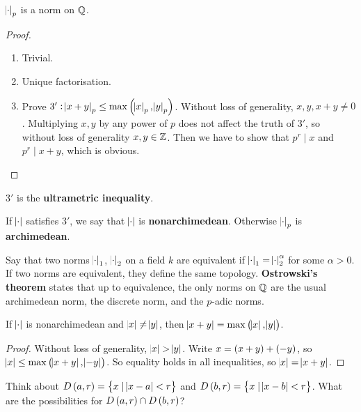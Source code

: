 \begin{lemma}
$ \abs{\cdot}_p $ is a norm on $ \mathbb{Q} $.
\end{lemma}

\begin{proof}
\hfill
\begin{enumerate}
\item Trivial.
\item Unique factorisation.
\item Prove $ 3' : \abs{x + y}_p \le \max\br{\abs{x}_p, \abs{y}_p} $. Without loss of generality, $ x, y, x + y \ne 0 $. Multiplying $ x, y $ by any power of $ p $ does not affect the truth of $ 3' $, so without loss of generality $ x, y \in \mathbb{Z} $. Then we have to show that $ p^r \mid x $ and $ p^r \mid x + y $, which is obvious.
\end{enumerate}
\end{proof}

$ 3' $ is the \textbf{ultrametric inequality}.

\begin{definition}
If $ \abs{\cdot} $ satisfies $ 3' $, we say that $ \abs{\cdot} $ is \textbf{nonarchimedean}. Otherwise $ \abs{\cdot}_p $ is \textbf{archimedean}.
\end{definition}

Say that two norms $ \abs{\cdot}_1 $, $ \abs{\cdot}_2 $ on a field $ k $ are equivalent if $ \abs{\cdot}_1 = \abs{\cdot}_2^\alpha $ for some $ \alpha > 0 $. If two norms are equivalent, they define the same topology. \textbf{Ostrowski's theorem} states that up to equivalence, the only norms on $ \mathbb{Q} $ are the usual archimedean norm, the discrete norm, and the $ p $-adic norms.


\begin{lemma}
\label{lem:1.6}
If $ \abs{\cdot} $ is nonarchimedean and $ \abs{x} \ne \abs{y} $, then $ \abs{x + y} = \max\br{\abs{x}, \abs{y}} $.
\end{lemma}

\begin{proof}
Without loss of generality, $ \abs{x} > \abs{y} $. Write $ x = \br{x + y} + \br{-y} $, so $ \abs{x} \le \max\br{\abs{x + y}, \abs{-y}} $. So equality holds in all inequalities, so $ \abs{x} = \abs{x + y} $.
\end{proof}

\begin{example*}
Think about $ D\br{a, r} = \cbr{x \mid \abs{x - a} < r} $ and $ D\br{b, r} = \cbr{x \mid \abs{x - b} < r} $. What are the possibilities for $ D\br{a, r} \cap D\br{b, r} $?
\end{example*}

